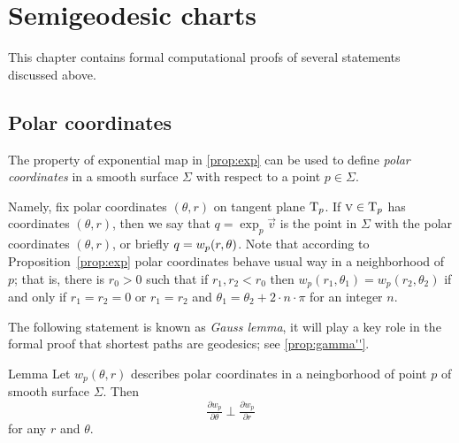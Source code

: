 \chapter{Semigeodesic charts}\label{chap:semigeodesic}

This chapter contains formal computational proofs of several statements discussed above.

\section*{Polar coordinates}

The property of exponential map in \ref{prop:exp} can be used to define \emph{polar coordinates} in a smooth surface $\Sigma$ with respect to a point $p\in \Sigma$.

Namely, fix polar coordinates $(\theta,r)$ on tangent plane $\mathrm{T}_p$.
If $\textsc v\in \mathrm{T}_p$ has coordinates $(\theta,r)$,
then we say that $q=\exp_p\vec v$ is the point in $\Sigma$ with the polar coordinates $(\theta,r)$, or briefly $q\z=w_p(r,\theta)$.
Note that according to Proposition~\ref{prop:exp} polar coordinates behave usual way in a neighborhood of $p$;
that is, there is $r_0>0$ such that if $r_1,r_2<r_0$ then $w_p(r_1,\theta_1) = w_p(r_2,\theta_2)$ if and only if
$r_1=r_2=0$ or $r_1=r_2$ and $\theta_1=\theta_2+2\cdot n\cdot\pi$ for an integer $n$.

The following statement is known as \emph{Gauss lemma},
it will play a key role in the formal proof that shortest paths are geodesics; see \ref{prop:gamma''}.

\begin{thm}{Lemma}\label{lem:palar-perp}
Let $w_p(\theta,r)$ describes polar coordinates in a neingborhood of point $p$ of smooth surface $\Sigma$.
Then
\[\tfrac{\partial w_p}{\partial\theta}\perp\tfrac{\partial w_p}{\partial r}\]
for any $r$ and $\theta$.
\end{thm}


